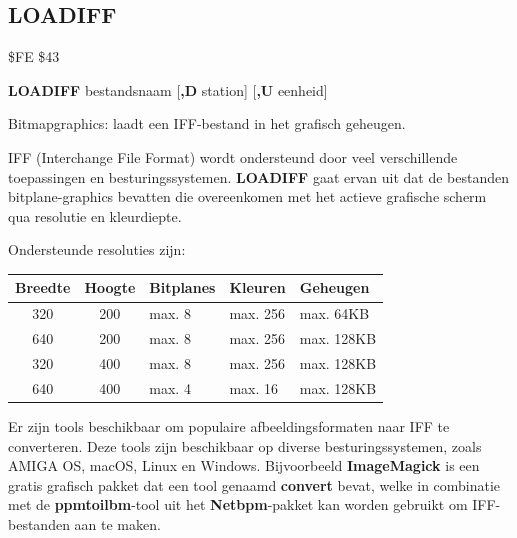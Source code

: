 
\newpage
\subsection{LOADIFF}
\begin{description}[leftmargin=2cm,style=nextline]
\item [Token:]    \$FE \$43

\item [Formaat:]   {\bf LOADIFF} bestandsnaam [{\bf,D} station] [{\bf,U} eenheid]

\item [Gebruik:]    Bitmapgraphics: laadt een IFF-bestand in het grafisch geheugen.

                  IFF (Interchange File Format) wordt ondersteund door veel verschillende toepassingen en besturingssystemen. {\bf LOADIFF} gaat ervan uit dat de bestanden bitplane-graphics bevatten die overeenkomen met het actieve grafische scherm qua resolutie en kleurdiepte.

                  Ondersteunde resoluties zijn:

                  \begin{center}
                  \setlength{\tabcolsep}{1mm}
                  \begin{tabular}{|c|c|l|l|l|}
                  \hline
                  {\bf Breedte} & {\bf Hoogte} & {\bf Bitplanes} & {\bf Kleuren} & {\bf Geheugen} \\
                  \hline
                  320         &  200    & max. 8     & max. 256 & max. 64KB \\                640         &  200    & max. 8     & max. 256 & max. 128KB \\                  320         &  400    & max. 8     & max. 256 & max. 128KB \\                  640         &  400    & max. 4     & max.  16 & max. 128KB \\
                  \hline
                  \end{tabular}
                  \end{center}

                  \filenamedefinition

                  \drivedefinition

                  \unitdefinition

\item [Opmerkingen:]  Er zijn tools beschikbaar om populaire afbeeldingsformaten naar IFF te converteren. Deze tools zijn beschikbaar op diverse besturingssystemen, zoals AMIGA OS, macOS, Linux en Windows. Bijvoorbeeld {\bf ImageMagick} is een gratis grafisch pakket dat een tool genaamd {\bf convert} bevat, welke in combinatie met de {\bf ppmtoilbm}-tool uit het {\bf Netbpm}-pakket kan worden gebruikt om IFF-bestanden aan te maken.


\end{description}
